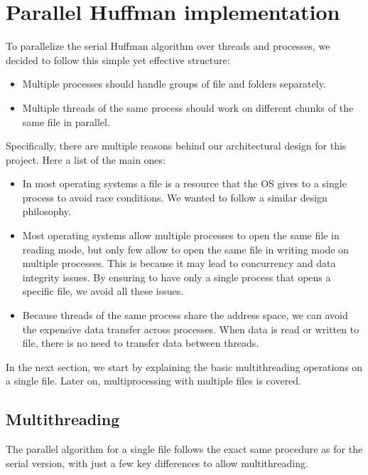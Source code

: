 \section{Parallel Huffman implementation}
To parallelize the serial Huffman algorithm over threads and processes, we decided to follow this simple yet effective structure:
\begin{itemize}
    \item Multiple processes should handle groups of file and folders separately.
    \item Multiple threads of the same process should work on different chunks of the same file in parallel.
\end{itemize}
Specifically, there are multiple reasons behind our architectural design for this project. Here a list of the main ones:
\begin{itemize}
	\item In most operating systems a file is a resource that the OS gives to a single process to avoid race conditions. We wanted to follow a similar design philosophy.
	\item Most operating systems allow multiple processes to open the same file in reading mode, but only few allow to open the same file in writing mode on multiple processes. This is because it may lead to concurrency and data integrity issues. By ensuring to have only a single process that opens a specific file, we avoid all these issues.
	\item Because threads of the same process share the address space, we can avoid the expensive data transfer across processes. When data is read or written to file, there is no need to transfer data between threads.
\end{itemize}
In the next section, we start by explaining the basic multithreading operations on a single file. Later on, multiprocessing with multiple files is covered.

\subsection{Multithreading}

The parallel algorithm for a single file follows the exact same procedure as for the serial version, with just a few key differences to allow multithreading. 

